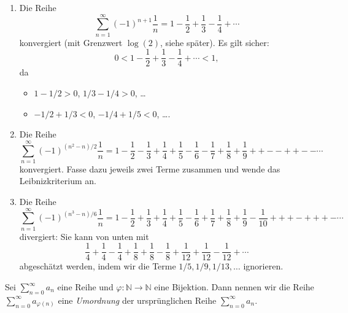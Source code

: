 \documentclass[../main.tex]{subfiles}
\begin{document}
\begin{examples}
  \leavevmode
  \begin{enumerate}[(1)]
    \item 
  Die Reihe
  \[
    \sum_{n=1}^{\infty} {(-1)}^{n+1} \frac{1}{n}
    = 1 - \frac{1}{2} + \frac{1}{3} - \frac{1}{4} + \cdots
  \]
  konvergiert (mit Grenzwert $\log(2)$, siehe später).
  Es gilt sicher:
  \[
    0 < 1 - \frac{1}{2} + \frac{1}{3} - \frac{1}{4}
    + \cdots < 1,
  \]
  da
  \begin{itemize}
    \item $1 - 1/2 > 0$, $1/3 - 1/4 > 0$, \dots
    \item $-1/2 + 1/3 < 0$, $-1/4 + 1/5 < 0$, \dots.
  
  \end{itemize}

\item Die Reihe
  \[
    \sum_{n=1}^{\infty} {(-1)}^{(n^2 - n)/2} \frac{1}{n}
    = 1 - \frac{1}{2} - \frac{1}{3} + \frac{1}{4}
    + \frac{1}{5} - \frac{1}{6} - \frac{1}{7} + \frac{1}{8} + \frac{1}{9} ++--++-- \cdots
  \]
  konvergiert. Fasse dazu jeweils zwei Terme zusammen und
  wende das Leibnizkriterium an.
\item Die Reihe
  \[
    \sum_{n=1}^{\infty} {(-1)}^{(n^3 - n)/6} \frac{1}{n}
    = 1  - \frac{1}{2} + \frac{1}{3} + \frac{1}{4} + \frac{1}{5}
    - \frac{1}{6} + \frac{1}{7} + \frac{1}{8} + \frac{1}{9} - \frac{1}{10} +++-+++- \cdots
  \]
  divergiert: Sie kann von unten mit
  \[
    \frac{1}{4} + \frac{1}{4} - \frac{1}{4} + \frac{1}{8} + \frac{1}{8} - \frac{1}{8} +
    \frac{1}{12} + \frac{1}{12} - \frac{1}{12} + \cdots
  \]
  abgeschätzt werden, indem wir die Terme $1/5, 1/9, 1/13, \dots$ ignorieren.
\end{enumerate}
\end{examples}

\begin{definition}
  Sei $\sum_{n=0}^{\infty} a_n$ eine Reihe und
  $\varphi \colon \mathbb{N} \to \mathbb{N}$ eine
  Bijektion. Dann nennen wir die Reihe
  $\sum_{n=0}^{\infty} a_{\varphi(n)}$ eine
  \emph{Umordnung} der ursprünglichen
  Reihe $\sum_{n=0}^{\infty} a_n$.
\end{definition}
\end{document}
